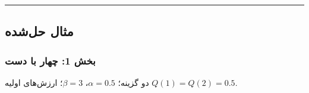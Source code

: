 \begin{center}\rule{0.5\linewidth}{0.5pt}\end{center}


\subsection{مثال حل‌شده}

\subsubsection{\texorpdfstring{بخش 1: چهار  با
دست}{بخش 1: چهار trial Q-learning با دست}}

دو گزینه؛ \(\alpha = 0.5\)، \(\beta = 3\)؛ ارزش‌های اولیه
\(Q(1) = Q(2) = 0.5\).

